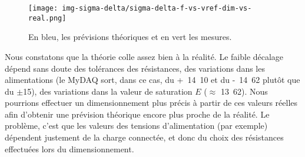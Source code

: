 \begin{figure}[ht]
	\centering
	\texttt{[image: img-sigma-delta/sigma-delta-f-vs-vref-dim-vs-real.png]}
	\caption{En bleu, les prévisions théoriques et en vert les mesures.}
	\label{fig:sigma-delta-f-vs-vref-dim-vs-real}
\end{figure}

Nous constatons que la théorie colle assez bien à la réalité. Le
faible décalage dépend sans doute des tolérances des résistances,
des variations dans les alimentations (le MyDAQ sort, dans ce cas, du
\unit{+14.10}{\volt} et du \unit{-14.62}{\volt} plutôt que du
$\pm$\unit{15}{\volt}), des variations dans la valeur de saturation
$E$ ($\approx$ \unit{13.62}{\volt}). Nous pourrions effectuer un
dimensionnement plus précis à partir de ces valeurs réelles afin
d'obtenir une prévision théorique encore plus proche de la réalité.
Le problème, c'est que les valeurs des tensions
d'alimentation (par exemple) dépendent justement de la charge 
connectée, et donc du choix des résistances effectuées lors du dimensionnement.